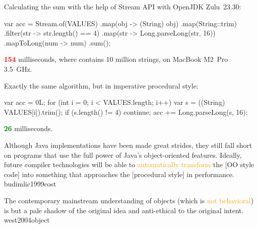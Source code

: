 \documentclass{article}
\newcommand\hlt[1]{\textcolor{orange}{#1}}
\begin{document}
  \begin{multicols}{2}
  Calculating the sum with the help of Stream API with OpenJDK Zulu~23.30:
  \par
  {\scriptsize
\begin{ffcode}
var acc = Stream.of(VALUES)
  .map(obj -> (String) obj)
  .map(String::trim)
  .filter(str -> str.length() == 4)
  .map(str -> Long.parseLong(str, 16))
  .mapToLong(num -> num)
  .sum();
\end{ffcode}
  \par}
  \textcolor{red}{\textbf{154}} milliseconds, where  contains 10 million strings, on MacBook M2~Pro 3.5~GHz.
  \par\columnbreak\par
  Exactly the same algorithm, but in imperative procedural style:
  \par
  {\scriptsize
\begin{ffcode}
var acc = 0L;
for (int i = 0; i < VALUES.length; i++) {
  var s = ((String) VALUES[i]).trim();
  if (s.length() != 4) continue;
  acc += Long.parseLong(s, 16);
}
\end{ffcode}
  \par}
  \textcolor{green}{\textbf{26}} milliseconds.
  \end{multicols}
  \plush{}


  {Although Java implementations have been made great strides, they still fall short on programs that use the full power of Java’s object-oriented features. Ideally, future compiler technologies will be able to \hlt{automatically transform} the [OO style code] into something that approaches the [procedural style] in performance.}
  {budimlic1999cost}


  {The contemporary mainstream understanding of objects (which is \hlt{not behavioral}) is but a pale shadow of the original idea and anti-ethical to the original intent.}
  {west2004object}
\end{document}

